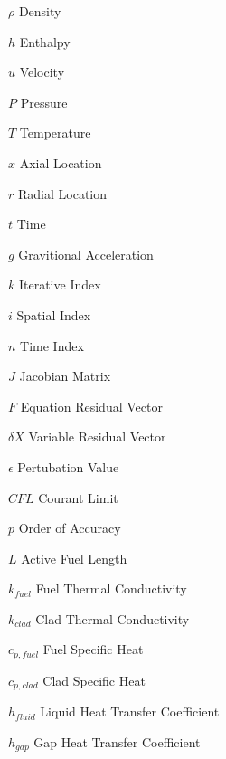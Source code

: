\begin{eqlist}
\item[$\rho$] Density
\item[$h$] Enthalpy
\item[$u$] Velocity
\item[$P$] Pressure
\item[$T$] Temperature
\item[$x$] Axial Location
\item[$r$] Radial Location
\item[$t$] Time
\item[$g$] Gravitional Acceleration
\item[$k$] Iterative Index
\item[$i$] Spatial Index
\item[$n$] Time Index
\item[$J$] Jacobian Matrix
\item[$F$] Equation Residual Vector
\item[$\delta X$] Variable Residual Vector
\item[$\epsilon$] Pertubation Value
\item[$CFL$] Courant Limit
\item[$p$] Order of Accuracy
\item[$L$] Active Fuel Length
\item[$k_{fuel}$] Fuel Thermal Conductivity
\item[$k_{clad}$] Clad Thermal Conductivity
\item[$c_{p,fuel}$] Fuel Specific Heat
\item[$c_{p,clad}$] Clad Specific Heat
\item[$h_{fluid}$] Liquid Heat Transfer Coefficient
\item[$h_{gap}$] Gap Heat Transfer Coefficient
\end{eqlist}